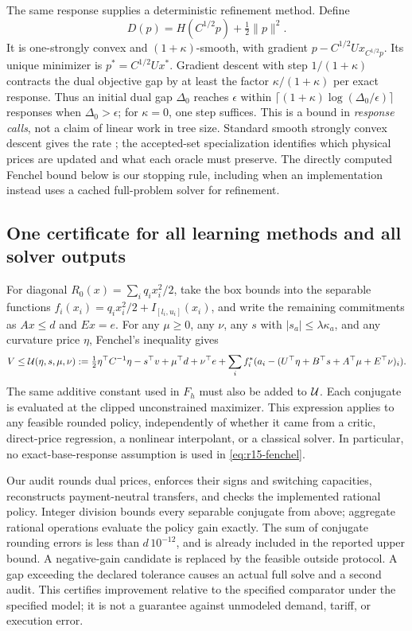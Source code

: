 The same response supplies a deterministic refinement method. Define
\begin{equation}\label{eq:r15-reduced}
 D(p)=H(C^{1/2}p)+\tfrac12\|p\|^2.
\end{equation}
It is one-strongly convex and $(1+\kappa)$-smooth, with gradient
$p-C^{1/2}Ux_{C^{1/2}p}$. Its unique minimizer is $p^*=C^{1/2}Ux^*$.
Gradient descent with step $1/(1+\kappa)$ contracts the dual objective gap by at least the factor $\kappa/(1+\kappa)$ per exact response. Thus an initial dual gap $\Delta_0$ reaches $\epsilon$ within
$\lceil(1+\kappa)\log(\Delta_0/\epsilon)\rceil$ responses when $\Delta_0>\epsilon$; for $\kappa=0$, one step suffices. This is a bound in \emph{response calls}, not a claim of linear work in tree size. Standard smooth strongly convex descent gives the rate \citep{Nesterov2004}; the accepted-set specialization identifies which physical prices are updated and what each oracle must preserve. The directly computed Fenchel bound below is our stopping rule, including when an implementation instead uses a cached full-problem solver for refinement.

\subsection{One certificate for all learning methods and all solver outputs}
For diagonal $R_0(x)=\sum_i q_ix_i^2/2$, take the box bounds into the separable functions
$f_i(x_i)=q_ix_i^2/2+I_{[l_i,u_i]}(x_i)$, and write the remaining commitments as $Ax\leq d$ and $Ex=e$. For any $\mu\geq0$, any $\nu$, any $s$ with $|s_a|\leq\lambda\kappa_a$, and any curvature price $\eta$, Fenchel's inequality gives
\begin{equation}\label{eq:r15-fenchel}
 V\leq {\cal U}(\eta,s,\mu,\nu):=
 \tfrac12\eta^\top C^{-1}\eta-s^\top v+\mu^\top d+\nu^\top e
 +\sum_i f_i^*(a_i-(U^\top\eta+B^\top s+A^\top\mu+E^\top\nu)_i).
\end{equation}
The same additive constant used in $F_h$ must also be added to ${\cal U}$. Each conjugate is evaluated at the clipped unconstrained maximizer. This expression applies to any feasible rounded policy, independently of whether it came from a critic, direct-price regression, a nonlinear interpolant, or a classical solver. In particular, no exact-base-response assumption is used in \eqref{eq:r15-fenchel}.

Our audit rounds dual prices, enforces their signs and switching capacities, reconstructs payment-neutral transfers, and checks the implemented rational policy. Integer division bounds every separable conjugate from above; aggregate rational operations evaluate the policy gain exactly. The sum of conjugate rounding errors is less than $d\,10^{-12}$, and is already included in the reported upper bound. A negative-gain candidate is replaced by the feasible outside protocol. A gap exceeding the declared tolerance causes an actual full solve and a second audit. This certifies improvement relative to the specified comparator under the specified model; it is not a guarantee against unmodeled demand, tariff, or execution error.

